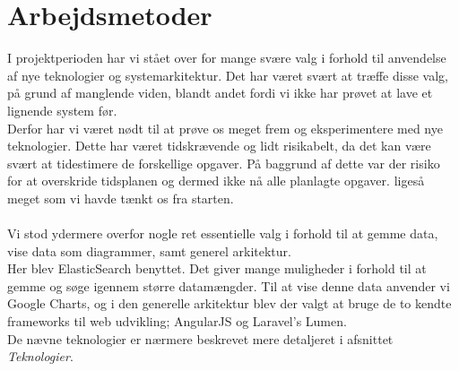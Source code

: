 \section{Arbejdsmetoder}
I projektperioden har vi stået over for mange svære valg i forhold til anvendelse af nye teknologier og systemarkitektur.
Det har været svært at træffe disse valg, på grund af manglende viden, blandt andet fordi vi ikke har prøvet at lave et lignende system før.
\\
Derfor har vi været nødt til at prøve os meget frem og eksperimentere med nye teknologier. Dette har været tidskrævende og
lidt risikabelt, da det kan være svært at tidestimere de forskellige opgaver. 
På baggrund af dette var der risiko for at overskride tidsplanen og dermed ikke nå alle planlagte opgaver. 
ligeså meget som vi havde tænkt os fra starten.
\\\\
Vi stod ydermere overfor nogle ret essentielle valg i forhold til at gemme data, vise data som diagrammer, samt generel arkitektur.
\\
Her  blev ElasticSearch benyttet. Det giver mange muligheder i forhold til at gemme og søge igennem større datamængder. Til at vise
denne data anvender vi Google Charts, og i den generelle arkitektur blev der valgt at bruge de to kendte frameworks til web udvikling; AngularJS og Laravel's Lumen.
\\
De nævne teknologier er nærmere beskrevet mere detaljeret i afsnittet \textit{Teknologier}.
